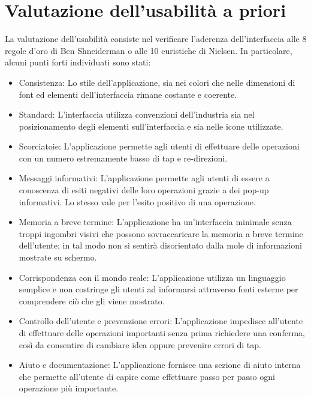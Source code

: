     \section{Valutazione dell’usabilità a priori}
        La valutazione dell'usabilità consiste nel verificare l'aderenza dell'interfaccia alle 8 regole d'oro di Ben Shneiderman o alle 10 euristiche di Nielsen. In particolare, alcuni punti forti individuati sono stati:
        \begin{itemize}
            \item Consistenza: Lo stile dell'applicazione, sia nei colori che nelle dimensioni di font ed elementi dell'interfaccia rimane costante e coerente.
            \item Standard: L'interfaccia utilizza convenzioni dell'industria sia nel posizionamento degli elementi sull'interfaccia e sia nelle icone utilizzate.
            \item Scorciatoie: L'applicazione permette agli utenti di effettuare delle operazioni con un numero estremamente basso di tap e re-direzioni.
            \item Messaggi informativi: L'applicazione permette agli utenti di essere a conoscenza di esiti negativi delle loro operazioni grazie a dei pop-up informativi. Lo stesso vale per l'esito positivo di una operazione.
            \item Memoria a breve termine: L'applicazione ha un'interfaccia minimale senza troppi ingombri visivi che possono sovraccaricare la memoria a breve termine dell'utente; in tal modo non si sentirà disorientato dalla mole di informazioni mostrate su schermo.
            \item Corrispondenza con il mondo reale: L'applicazione utilizza un linguaggio semplice e non costringe gli utenti ad informarsi attraverso fonti esterne per comprendere ciò che gli viene mostrato.
            \item Controllo dell'utente e prevenzione errori: L'applicazione impedisce all'utente di effettuare delle operazioni importanti senza prima richiedere una conferma, così da consentire di cambiare idea oppure prevenire errori di tap.
            \item Aiuto e documentazione: L'applicazione fornisce una sezione di aiuto interna che permette all'utente di capire come effettuare passo per passo ogni operazione più importante.
        \end{itemize}
    
